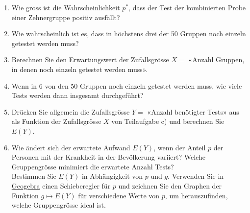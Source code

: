 \begin{ueb}
\begin{enumerate}
              \begin{enumerate}
                  \item Wie gross ist die Wahrscheinlichkeit \( p^* \), dass der Test der kombinierten Probe einer Zehnergruppe positiv ausfällt?
                  \item Wie wahrscheinlich ist es, dass in höchstens drei der 50 Gruppen noch einzeln getestet werden muss?
                  \item Berechnen Sie den Erwartungswert der Zufallsgrösse \( X = \) «Anzahl Gruppen, in denen noch einzeln getestet werden muss».
                  \item Wenn in 6 von den 50 Gruppen noch einzeln getestet werden muss, wie viele Tests werden dann insgesamt durchgeführt?
                  \item Drücken Sie allgemein die Zufallsgrösse \( Y = \) «Anzahl benötigter Tests» aus als Funktion der Zufallsgrösse \( X \) von Teilaufgabe c) und berechnen Sie \( E(Y) \).
                  \item Wie ändert sich der erwartete Aufwand \( E(Y) \), wenn der Anteil \( p \) der Personen mit der Krankheit in der Bevölkerung variiert? Welche Gruppengrösse minimiert die erwartete Anzahl Tests?\\
                        Bestimmen Sie \(E(Y)\) in Abhängigkeit von \(p\) und \(g\). Verwenden Sie in \href{https://www.geogebra.org/calculator}{Geogebra} einen Schieberegler für \(p\) und zeichnen Sie den Graphen der Funktion \(g\mapsto E(Y)\) für verschiedene Werte von \(p\), um herauszufinden, welche Gruppengrösse ideal ist.
              \end{enumerate}


    \end{enumerate}




\end{ueb}


